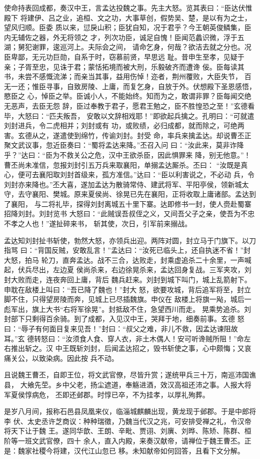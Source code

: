 使命持表回成都，奏汉中王，言孟达投魏之事。先主大怒。览其表曰：“臣达伏惟殿下
将建伊、吕之业，追桓、文之功，大事草创，假势吴、楚，是以有为之士，望风归顺。臣委
质以来，愆戾山积；臣犹自知，况于君乎？今王朝英俊鳞集，臣内无辅佐之器，外无将领之
才，列次功臣，诚足自愧！臣闻范蠡识微，浮于五湖；舅犯谢罪，逡巡河上。夫际会之间，
请命乞身，何哉？欲洁去就之分也。况臣卑鄙，无元功巨勋，自系于时，窃慕前贤，早思远
耻。昔申生至孝，见疑于亲；子胥至忠，见诛于君；蒙恬拓境而被大刑，乐毅破齐而遭谗
佞。臣每读其书，未尝不感慨流涕；而亲当其事，益用伤悼！迩者，荆州覆败，大臣失节，
百无一还；惟臣寻事，自致房陵、上庸，而复乞身，自放于外。伏想殿下圣恩感悟，愍臣之
心，悼臣之举。臣诚小人，不能始终。知而为之，敢谓非罪？臣每闻交绝无恶声，去臣无怨
辞，臣过奉教于君子，愿君王勉之，臣不胜惶恐之至！”玄德看毕，大怒曰：“匹夫叛吾，
安敢以文辞相戏耶！”即欲起兵擒之。孔明曰：“可就遣刘封进兵，令二虎相并；刘封或有
功，或败绩，必归成都，就而除之，可绝两害。玄德从之，遂遣使到绵竹，传谕刘封。封受
命，率兵来擒孟达。却说曹丕正聚文武议事，忽近臣奏曰：“蜀将孟达来降。”丕召入问
曰：“汝此来，莫非诈降乎？”达曰：“臣为不救关公之危，汉中王欲杀臣，因此惧罪来
降，别无他意。”！曹丕尚未准信，忽报刘封引五万兵来取襄阳，单搦孟达厮杀。丕曰：
“汝既是真心，便可去襄阳取刘封首级来，孤方准信。”达曰：“臣以利害说之，不必动
兵，令刘封亦来降也。”丕大喜，遂加孟达为散骑常侍、建武将军、平阳亭侯，领新城太
守，去守襄阳、樊城。原来夏侯尚、徐晃已先在襄阳，正将收取上庸诸部。孟达到了襄阳，
与二将礼毕，探得刘封离城五十里下寨。达即修书一封，使人赍赴蜀寨招降刘封。刘封览书
大怒曰：“此贼误吾叔侄之义，又间吾父子之亲，使吾为不忠不孝之人也！”遂扯碎来书，
斩其使，次日，引军前来搦战。

孟达知刘封扯书斩使，勃然大怒，亦领兵出迎。两阵对圆，封立马于门旗下。以刀指骂
曰：“背国反贼，安敢乱言！”孟达曰：“汝死已临头上，还自执迷不省！”封大怒，拍马
轮刀，直奔孟达。战不三合，达败走，封乘虚追杀二十余里，一声喊起，伏兵尽出，左边夏
侯尚杀来，右边徐晃杀来，孟达回身复战。三军夹攻，刘封大败而走，连夜奔回上庸，背后
魏兵赶来。刘封到城下叫门，城上乱箭射下。申耽在敌楼上叫曰：“吾已降了魏也！”封大
怒，欲要攻城，背后追军将至，封立脚不住，只得望房陵而奔，见城上已尽插魏旗。申仪在
敌楼上将旗一飐，城后一彪军出，旗上大书“右将军徐晃”。封抵敌不住，急望西川而走。
晃乘势追杀。刘封部下只剩得百余骑。到了成都，入见汉中王，哭拜于地，细奏前事。玄德
怒曰：“辱子有何面目复来见吾！”封曰：“叔父之难，非儿不救，因孟达谏阻故耳。”玄
德转怒曰：“汝须食人食、穿人衣，非土木偶人！安可听谗贼所阻！”命左右推出斩之。汉
中王既斩刘封，后闻孟达招之，毁书斩使之事，心中颇悔；又哀痛关公，以致染病。因此按
兵不动。

且说魏王曹丕，自即王位，将文武官僚，尽皆升赏；遂统甲兵三十万，南巡沛国谯县，
大飨先茔。乡中父老，扬尘遮道，奉觞进酒，效汉高祖还沛之事。人报大将军夏侯惇病危，
丕即还邺郡。时惇已卒，不为挂孝，以厚礼殉葬。

是岁八月间，报称石邑县凤凰来仪，临淄城麒麟出现，黄龙现于邺郡。于是中郎将李
伏、太史丞许芝商议：种种瑞徵，乃魏当代汉之兆，可安排受禅之礼，令汉帝将天下让于魏
王。遂同华歆、王朗、辛毗、贾诩、刘廙、刘晔、陈矫、陈群、桓阶等一班文武官僚，四十
余人，直入内殿，来奏汉献帝，请禅位于魏王曹丕。正是：魏家社稷今将建，汉代江山忽已
移。未知献帝如何回答，且看下文分解。